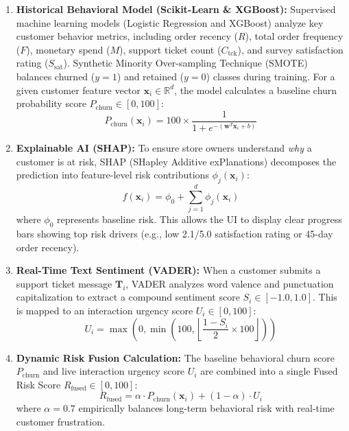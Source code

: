 \documentclass[conference]{IEEEtran}
\begin{document}
\begin{enumerate}
    \item \textbf{Historical Behavioral Model (Scikit-Learn \& XGBoost):} Supervised machine learning models (Logistic Regression and XGBoost) analyze key customer behavior metrics, including order recency ($R$), total order frequency ($F$), monetary spend ($M$), support ticket count ($C_{\text{tck}}$), and survey satisfaction rating ($S_{\text{sat}}$). Synthetic Minority Over-sampling Technique (SMOTE) balances churned ($y=1$) and retained ($y=0$) classes during training. For a given customer feature vector $\mathbf{x}_i \in \mathbb{R}^d$, the model calculates a baseline churn probability score $P_{\text{churn}} \in [0, 100]$:
    \begin{equation}
    P_{\text{churn}}(\mathbf{x}_i) = 100 \times \frac{1}{1 + e^{-(\mathbf{w}^T \mathbf{x}_i + b)}}
    \end{equation}

    \item \textbf{Explainable AI (SHAP):} To ensure store owners understand \textit{why} a customer is at risk, SHAP (SHapley Additive exPlanations) decomposes the prediction into feature-level risk contributions $\phi_j(\mathbf{x}_i)$:
    \begin{equation}
    f(\mathbf{x}_i) = \phi_0 + \sum_{j=1}^d \phi_j(\mathbf{x}_i)
    \end{equation}
    where $\phi_0$ represents baseline risk. This allows the UI to display clear progress bars showing top risk drivers (e.g., low 2.1/5.0 satisfaction rating or 45-day order recency).

    \item \textbf{Real-Time Text Sentiment (VADER):} When a customer submits a support ticket message $\mathbf{T}_i$, VADER analyzes word valence and punctuation capitalization to extract a compound sentiment score $S_i \in [-1.0, 1.0]$. This is mapped to an interaction urgency score $U_i \in [0, 100]$:
    \begin{equation}
    U_i = \max\left(0, \min\left(100, \left\lfloor \frac{1 - S_i}{2} \times 100 \right\rfloor \right)\right)
    \end{equation}

    \item \textbf{Dynamic Risk Fusion Calculation:} The baseline behavioral churn score $P_{\text{churn}}$ and live interaction urgency score $U_i$ are combined into a single Fused Risk Score $R_{\text{fused}} \in [0, 100]$:
    \begin{equation}
    R_{\text{fused}} = \alpha \cdot P_{\text{churn}}(\mathbf{x}_i) + (1 - \alpha) \cdot U_i
    \end{equation}
    where $\alpha = 0.7$ empirically balances long-term behavioral risk with real-time customer frustration.
\end{enumerate}
\end{document}
